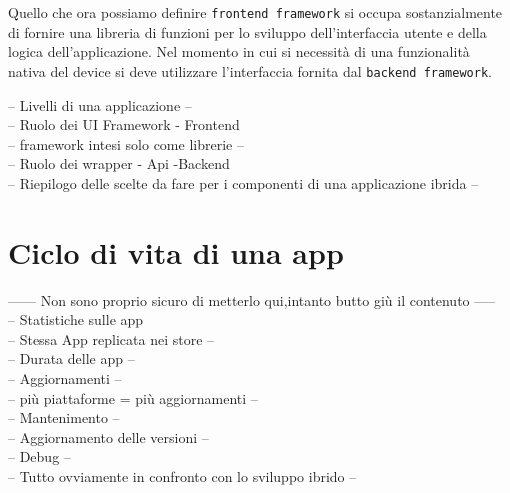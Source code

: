 Quello che ora possiamo definire \texttt{frontend framework} si occupa sostanzialmente di fornire una libreria di funzioni per lo sviluppo dell'interfaccia utente e della logica dell'applicazione. Nel momento in cui si necessità di una funzionalità nativa del device si deve utilizzare l'interfaccia fornita dal \texttt{backend framework}.

-- Livelli di una applicazione -- \\
-- Ruolo dei UI Framework - Frontend \\
	-- framework intesi solo come librerie --\\
-- Ruolo dei wrapper - Api -Backend \\
-- Riepilogo delle scelte da fare per i componenti di una applicazione ibrida --

\section{Ciclo di vita di una app}
------ Non sono proprio sicuro di metterlo qui,intanto butto giù il contenuto -----\\
-- Statistiche sulle app\\
	-- Stessa App replicata nei store --\\
	-- Durata delle app --\\
-- Aggiornamenti --\\
	-- più piattaforme = più aggiornamenti --\\
-- Mantenimento --\\
	-- Aggiornamento delle versioni --\\
	-- Debug --\\
-- Tutto ovviamente in confronto con lo sviluppo ibrido --

	
